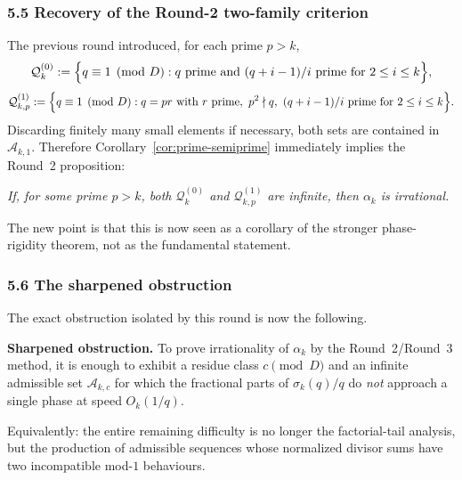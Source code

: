 \subsubsection*{5.5 Recovery of the Round-2 two-family criterion}
The previous round introduced, for each prime $p>k$,
\[
\mathcal{Q}_k^{(0)}:=\Bigl\{q\equiv1\pmod D: q\text{ prime and }(q+i-1)/i\text{ prime for }2\le i\le k\Bigr\},
\]
\[
\mathcal{Q}_{k,p}^{(1)}:=\Bigl\{q\equiv1\pmod D: q=pr\text{ with }r\text{ prime},\ p^2\nmid q,
\ (q+i-1)/i\text{ prime for }2\le i\le k\Bigr\}.
\]
Discarding finitely many small elements if necessary, both sets are contained in $\mathcal{A}_{k,1}$. Therefore Corollary~\ref{cor:prime-semiprime} immediately implies the Round~2 proposition:

\medskip
\noindent
\emph{If, for some prime $p>k$, both $\mathcal{Q}_k^{(0)}$ and $\mathcal{Q}_{k,p}^{(1)}$ are infinite, then $\alpha_k$ is irrational.}

\medskip
\noindent
The new point is that this is now seen as a corollary of the stronger phase-rigidity theorem, not as the fundamental statement.

\subsubsection*{5.6 The sharpened obstruction}
The exact obstruction isolated by this round is now the following.

\medskip
\noindent
\textbf{Sharpened obstruction.} To prove irrationality of $\alpha_k$ by the Round~2/Round~3 method, it is enough to exhibit a residue class $c\pmod D$ and an infinite admissible set $\mathcal{A}_{k,c}$ for which the fractional parts of $\sigma_k(q)/q$ do \emph{not} approach a single phase at speed $O_k(1/q)$.

\medskip
\noindent
Equivalently: the entire remaining difficulty is no longer the factorial-tail analysis, but the production of admissible sequences whose normalized divisor sums have two incompatible mod-$1$ behaviours.

